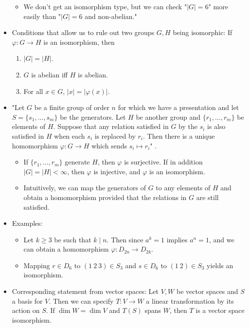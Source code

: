 \documentclass[../notes.tex]{subfiles}
\begin{document}
\begin{itemize}
    \begin{itemize}
        \item We don't get an isomorphism type, but we can check "$|G|=6$" more easily than "$|G|=6$ and non-abelian."
    \end{itemize}
    \item Conditions that allow us to rule out two groups $G,H$ being isomorphic: If $\varphi:G\to H$ is an isomorphism, then
    \begin{enumerate}
        \item $|G|=|H|$.
        \item $G$ is abelian iff $H$ is abelian.
        \item For all $x\in G$, $|x|=|\varphi(x)|$.
    \end{enumerate}
    \item "Let $G$ be a finite group of order $n$ for which we have a presentation and let $S=\{s_1,\dots,s_m\}$ be the generators. Let $H$ be another group and $\{r_1,\dots,r_m\}$ be elements of $H$. Suppose that any relation satisfied in $G$ by the $s_i$ is also satisfied in $H$ when each $s_i$ is replaced by $r_i$. Then there is a unique homomorphism $\varphi:G\to H$ which sends $s_i\mapsto r_i$" \parencite[38-39]{bib:DummitFoote}.
    \begin{itemize}
        \item If $\{r_1,\dots,r_m\}$ generate $H$, then $\varphi$ is surjective. If in addition $|G|=|H|<\infty$, then $\varphi$ is injective, and $\varphi$ is an isomorphism.
        \item Intuitively, we can map the generators of $G$ to any elements of $H$ and obtain a homomorphism provided that the relations in $G$ are still satisfied.
    \end{itemize}
    \item Examples:
    \begin{itemize}
        \item Let $k\geq 3$ be such that $k\mid n$. Then since $a^k=1$ implies $a^n=1$, and we can obtain a homomorphism $\varphi:D_{2n}\to D_{2k}$.
        \item Mapping $r\in D_6$ to $(1\ 2\ 3)\in S_3$ and $s\in D_6$ to $(1\ 2)\in S_3$ yields an isomorphism.
    \end{itemize}
    \item Corresponding statement from vector spaces: Let $V,W$ be vector spaces and $S$ a basis for $V$. Then we can specify $T:V\to W$ a linear transformation by its action on $S$. If $\dim W=\dim V$ and $T(S)$ spans $W$, then $T$ is a vector space isomorphism.
\end{itemize}
\end{document}
